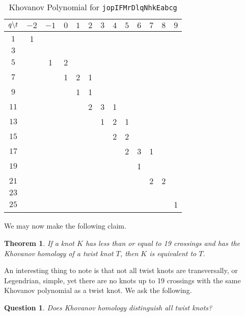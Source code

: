 \documentclass{article}
\theoremstyle{plain}
\newtheorem{theorem}{Theorem}
\newtheorem{question}{Question}
\begin{document}
        \begin{table}[H]
            \centering
            \begin{tabular}{| c | c | c | c | c | c | c | c | c | c | c | c | c |}
                \hline
                $q\symbol{92}t$&$-2$&$-1$&$0$&$1$&$2$&$3$&$4$&$5$&$6$&$7$&$8$&$9$\\
                \hline
                $1$&1&&&&&&&&&&&\\
                \hline
                $3$&&&&&&&&&&&&\\
                \hline
                $5$&&1&2&&&&&&&&&\\
                \hline
                $7$&&&1&2&1&&&&&&&\\
                \hline
                $9$&&&&1&1&&&&&&&\\
                \hline
                $11$&&&&&2&3&1&&&&&\\
                \hline
                $13$&&&&&&1&2&1&&&&\\
                \hline
                $15$&&&&&&&2&2&&&&\\
                \hline
                $17$&&&&&&&&2&3&1&&\\
                \hline
                $19$&&&&&&&&&1&&&\\
                \hline
                $21$&&&&&&&&&&2&2&\\
                \hline
                $23$&&&&&&&&&&&&\\
                \hline
                $25$&&&&&&&&&&&&1\\
                \hline
            \end{tabular}
            \caption{Khovanov Polynomial for \texttt{jopIFMrDlqNhkEabcg}}
            \label{table:jopIFMrDlqNhkEabcg_kho}
        \end{table}
        We may now make the following claim.
        \begin{theorem}
            If a knot $K$ has less than or equal to 19 crossings and has the
            Khovanov homology of a twist knot $T$,
            then $K$ is equivalent to $T$.
        \end{theorem}
        An interesting thing to note is that not all twist knots are
        transversally, or Legendrian, simple, yet there are no knots up to
        19 crossings with the same Khovanov polynomial as a twist knot. We
        ask the following.
        \begin{question}
            Does Khovanov homology distinguish all twist knots?
        \end{question}
\end{document}
